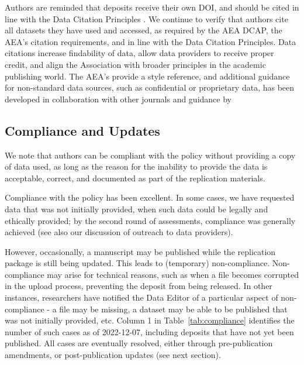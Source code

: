 Authors are reminded that deposits receive their own \ac{DOI}, and should be cited in line with the Data Citation Principles \citep{Altman2013-fl,jddcp}. We continue to verify that authors cite all datasets they have used and accessed, as required by the AEA \ac{DCAP}, the AEA's citation requirements, and in line with the Data Citation Principles.  Data citations increase findability of data, allow data providers to receive proper credit, and align the Association with broader principles in the academic publishing world. The AEA's   provide a style reference, and additional guidance for non-standard data sources, such as confidential or proprietary data, has been developed in collaboration with other journals and guidance by 



\subsection{Compliance and Updates}
\label{sec:compliance}

We note that authors can be compliant with the policy without providing a copy of data used, as long as the reason for the inability to provide the data is acceptable, correct, and documented as part of the replication materials. 

Compliance with the policy %
has been excellent. In some cases, we have requested data that was not initially provided, when such data could be legally and ethically provided; by the second round of assessments, compliance was generally achieved (see also our discussion of outreach to data providers).

However, occasionally, a manuscript may be published while the replication package is still being updated. This leads to (temporary) non-compliance. Non-compliance may arise for technical reasons, such as when a file becomes corrupted in the upload process, preventing the deposit from being released. In other instances, researchers have notified the Data Editor of a particular aspect of non-compliance - a file may be missing, a dataset may be able to be published that was not initially provided, etc. Column 1 in Table~\ref{tab:compliance} identifies the number of such cases as of 2022-12-07,  including deposits that have not yet been published. All cases are eventually resolved, either through pre-publication amendments, or post-publication updates (see next section).


